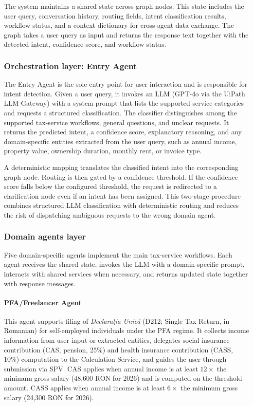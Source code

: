 \documentclass[3p,times,procedia]{elsarticle}
\begin{document}
The system maintains a shared state across graph nodes. This state includes the user query, conversation history, routing fields, intent classification results, workflow status, and a context dictionary for cross-agent data exchange. The graph takes a user query as input and returns the response text together with the detected intent, confidence score, and workflow status.

\subsubsection{Orchestration layer: Entry Agent}
\label{subsubsec:entry}

The Entry Agent is the sole entry point for user interaction and is responsible for intent detection. Given a user query, it invokes an LLM (GPT-4o via the UiPath LLM Gateway) with a system prompt that lists the supported service categories and requests a structured classification. The classifier distinguishes among the supported tax-service workflows, general questions, and unclear requests. It returns the predicted intent, a confidence score, explanatory reasoning, and any domain-specific entities extracted from the user query, such as annual income, property value, ownership duration, monthly rent, or invoice type.

A deterministic mapping translates the classified intent into the corresponding graph node. Routing is then gated by a confidence threshold. If the confidence score falls below the configured threshold, the request is redirected to a clarification node even if an intent has been assigned. This two-stage procedure combines structured LLM classification with deterministic routing and reduces the risk of dispatching ambiguous requests to the wrong domain agent.

\subsubsection{Domain agents layer}
\label{subsubsec:domain}

Five domain-specific agents implement the main tax-service workflows. Each agent receives the shared state, invokes the LLM with a domain-specific prompt, interacts with shared services when necessary, and returns updated state together with response messages.

\paragraph{PFA/Freelancer Agent}
This agent supports filing of \textit{Declara\c{t}ia Unic\u{a}} (D212; Single Tax Return, in Romanian) for self-employed individuals under the PFA regime. It collects income information from user input or extracted entities, delegates social insurance contribution (CAS, pension, 25\%) and health insurance contribution (CASS, 10\%) computation to the Calculation Service, and guides the user through submission via SPV. CAS applies when annual income is at least $12 \times$ the minimum gross salary (48{,}600 RON for 2026) and is computed on the threshold amount. CASS applies when annual income is at least $6 \times$ the minimum gross salary (24{,}300 RON for 2026).
\end{document}
